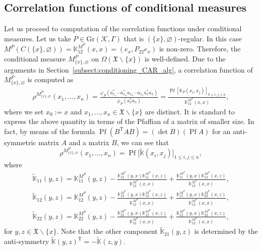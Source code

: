 \documentclass[11pt]{article}
\numberwithin{equation}{section}
\numberwithin{equation}{section}
\newcommand{\pf}{\operatorname{Pf}}
\newcommand{\mfrak}[1]{\mathfrak{#1}}
\newcommand{\mcal}[1]{\mathcal{#1}}
\newcommand{\mbb}[1]{\mathbb{#1}}
\newcommand{\mrm}[1]{\mathrm{#1}}
\begin{document}
\subsection{Correlation functions of conditional measures}
Let us proceed to computation of the correlation functions under conditional measures.
Let us take $P\in \mrm{Gr}(\mcal{K},\Gamma)$ that is $(\{x\},\varnothing)$-regular. In this case $M^{P}(C(\{x\},\varnothing))=\mbb{K}^{M^{P}}_{12}(x,x)=(e_{x},P_{22}e_{x})$ is non-zero. Therefore, the conditional measure $M^{P}_{\{x\},\varnothing}$ on $\Omega (\mfrak{X}\backslash\{x\})$ is well-defined. Due to the arguments in Section~\ref{subsect:conditioning_CAR_alg}, a correlation function of $M^{P}_{\{x\},\varnothing}$ is computed as
\begin{gather*}
	\rho^{M^{P}_{\{x\},\varnothing}}(x_{1},\dots, x_{n}) =\frac{\varphi_{P}(a_{x_{1}}^{\ast}\cdots a_{x_{n}}^{\ast}a_{x_{n}}\cdots a_{x_{1}}a_{x}^{\ast}a_{x})}{\varphi_{P}(a_{x}^{\ast}a_{x})}
	 =\frac{\pf \left[\mbb{K}_{P}(x_{i},x_{j})\right]_{0\le i,j\le n}}{\mbb{K}^{M^{P}}_{12}(x,x)},
\end{gather*}
where we set $x_{0}:=x$ and $x_{1},\dots, x_{n}\in \mfrak{X}\backslash \{x\}$ are distinct.
It is standard to express the above quantity in terms of the Pfaffian of a matrix of smaller size.
In fact, by means of the formula $\pf (B^{\mrm{T}}AB)=(\det B)(\pf A)$ for an anti-symmetric matrix $A$ and a matrix $B$, we can see that
\begin{equation*}
	\rho^{M^{P}_{\{x\},\varnothing}}(x_{1},\dots, x_{n})=\pf \big[\widetilde{\mbb{K}}(x_{i},x_{j})\big]_{1\le i,j\le n},
\end{equation*}
where
\begin{gather*}
\widetilde{\mbb{K}}_{11}(y,z)=\mbb{K}^{M^{P}}_{11}(y,z)-\frac{\mbb{K}^{M^{P}}_{12}(y,x)\mbb{K}^{M^{P}}_{11}(x,z)}{\mbb{K}^{M^{P}}_{12}(x,x)}+\frac{\mbb{K}^{M^{P}}_{11}(y,x)\mbb{K}^{M^{P}}_{12}(x,z)}{\mbb{K}^{M^{P}}_{12}(x,x)}, \\
\widetilde{\mbb{K}}_{12}(y,z)=\mbb{K}^{M^{P}}_{12}(y,z)-\frac{\mbb{K}^{M^{P}}_{12}(y,x)\mbb{K}^{M^{P}}_{12}(x,z)}{\mbb{K}^{M^{P}}_{12}(x,x)}+\frac{\mbb{K}^{M^{P}}_{11}(y,x)\mbb{K}^{M^{P}}_{22}(x,z)}{\mbb{K}^{M^{P}}_{12}(x,x)}, \\
\widetilde{\mbb{K}}_{22}(y,z)=\mbb{K}^{M^{P}}_{22}(y,z)-\frac{\mbb{K}^{M^{P}}_{22}(y,x)\mbb{K}^{M^{P}}_{12}(x,z)}{\mbb{K}^{M^{P}}_{12}(x,x)}+\frac{\mbb{K}^{M^{P}}_{12}(y,x)\mbb{K}^{M^{P}}_{22}(x,z)}{\mbb{K}^{M^{P}}_{12}(x,x)},
\end{gather*}
for $y,z\in\mfrak{X}\backslash\{x\}$. Note that the other component $\widetilde{\mbb{K}}_{21}(y,z)$ is determined by the anti-symmetry $\widetilde{\mbb{K}}(y,z)^{\mrm{T}}=-\widetilde{\mbb{K}}(z,y)$.
\end{document}
